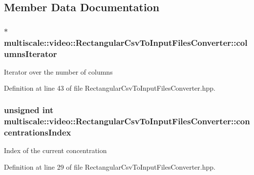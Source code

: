 \subsection{Member Data Documentation}
\hypertarget{classmultiscale_1_1video_1_1RectangularCsvToInputFilesConverter_aeeee251d65b8c189a72d08f3c70a94be}{
\subsubsection[{columns\-Iterator}]{$\ast$ multiscale\-::video\-::\-Rectangular\-Csv\-To\-Input\-Files\-Converter\-::columns\-Iterator\hspace{0.3cm}{\ttfamily [private]}}}\label{classmultiscale_1_1video_1_1RectangularCsvToInputFilesConverter_aeeee251d65b8c189a72d08f3c70a94be}
Iterator over the number of columns 

Definition at line 43 of file Rectangular\-Csv\-To\-Input\-Files\-Converter.\-hpp.

\hypertarget{classmultiscale_1_1video_1_1RectangularCsvToInputFilesConverter_a48b31e858d0ebac757af77703202634f}{
\subsubsection[{concentrations\-Index}]{\setlength{\rightskip}{0pt plus 5cm}unsigned int multiscale\-::video\-::\-Rectangular\-Csv\-To\-Input\-Files\-Converter\-::concentrations\-Index\hspace{0.3cm}{\ttfamily [private]}}}\label{classmultiscale_1_1video_1_1RectangularCsvToInputFilesConverter_a48b31e858d0ebac757af77703202634f}
Index of the current concentration 

Definition at line 29 of file Rectangular\-Csv\-To\-Input\-Files\-Converter.\-hpp.

